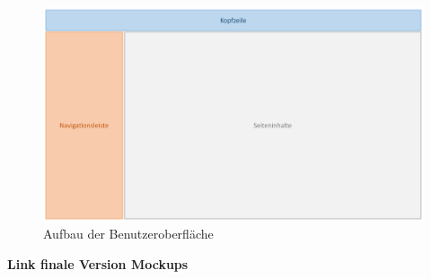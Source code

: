 \begin{figure}[h]
	\centering 
	\includegraphics[width=\textwidth]{img/Seitenaufbau1.pdf}
	\captionsetup{format=hang}
	\caption[Aufbau der Benutzeroberfläche]{\label{fig:Seitenaufbau}Aufbau der Benutzeroberfläche}
\end{figure}

\textbf{Link finale Version Mockups}

